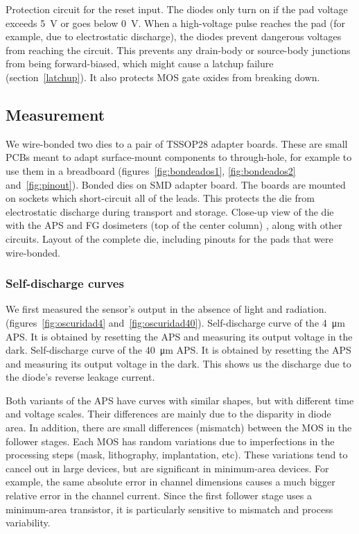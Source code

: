 {Protection circuit for the reset input.
The diodes only turn on if the pad voltage exceeds
\SI{5}{\volt} or goes below \SI{0}{\volt}.
When a high-voltage pulse reaches the pad
(for example, due to electrostatic discharge),
the diodes prevent dangerous voltages from reaching the circuit.
This prevents any drain-body or source-body junctions from being forward-biased,
which might cause a latchup failure (section~\ref{latchup}).
It also protects MOS gate oxides from breaking down.}
\subsection{Measurement}
We wire-bonded two dies to a pair of TSSOP28 adapter boards.
These are small PCBs meant to adapt surface-mount components
to through-hole, for example to use them in a breadboard
(figures~\ref{fig:bondeados1}, \ref{fig:bondeados2} and~\ref{fig:pinout}).
{Bonded dies on SMD adapter board.
The boards are mounted on sockets which short-circuit all of the leads.
This protects the die from electrostatic discharge during transport and storage.
}
{Close-up view of the die with the APS and FG dosimeters
(top of the center column)
, along with other circuits.}
{Layout of the complete die, including pinouts for the pads that were wire-bonded.}
\subsubsection{Self-discharge curves}
We first measured the sensor's output in the absence of light and radiation.
(figures~\ref{fig:oscuridad4} and~\ref{fig:oscuridad40}).
{Self-discharge curve of the \SI{4}{\micro\meter} APS.
It is obtained by resetting the APS and measuring its output voltage in the dark.}
{Self-discharge curve of the \SI{40}{\micro\meter} APS.
It is obtained by resetting the APS and measuring its output voltage in the dark.}
This shows us the discharge due to the diode's reverse leakage current.

Both variants of the APS have curves with similar shapes,
but with different time and voltage scales.
Their differences are mainly due to the disparity in diode area.
In addition, there are small differences (mismatch) between the MOS in the follower stages.
Each MOS has random variations due to imperfections in the processing steps
(mask, lithography, implantation, etc).
These variations tend to cancel out in large devices,
but are significant in minimum-area devices.
For example, the same absolute error in channel dimensions causes
a much bigger relative error in the channel current.
Since the first follower stage uses a minimum-area transistor,
it is particularly sensitive to mismatch and process variability.

